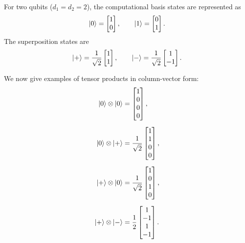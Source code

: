 \begin{example}
    For two qubits ($d_1 = d_2 = 2$), the computational basis states are represented as
    \[
    \ket{0} = \begin{bmatrix}1\\0\end{bmatrix}, \qquad
    \ket{1} = \begin{bmatrix}0\\1\end{bmatrix}.
    \]
    The superposition states are
    \[
    \ket{+} = \frac{1}{\sqrt{2}}\begin{bmatrix}1\\1\end{bmatrix}, \qquad
    \ket{-} = \frac{1}{\sqrt{2}}\begin{bmatrix}1\\-1\end{bmatrix}.
    \]
    
    We now give examples of tensor products in column-vector form:
    \begin{align*}
    \ket{0}\otimes\ket{0}
    &=
    \begin{bmatrix}1\\0\\0\\0\end{bmatrix},\\[6pt]
    \ket{0}\otimes\ket{+}
    &=
    \frac{1}{\sqrt{2}}
    \begin{bmatrix}1\\1\\0\\0\end{bmatrix},\\[6pt]
    \ket{+}\otimes\ket{0}
    &=
    \frac{1}{\sqrt{2}}
    \begin{bmatrix}1\\0\\1\\0\end{bmatrix},\\[6pt]
    \ket{+}\otimes\ket{-}
    &=
    \frac{1}{2}
    \begin{bmatrix}1\\-1\\1\\-1\end{bmatrix}.
    \end{align*}


\end{example}
